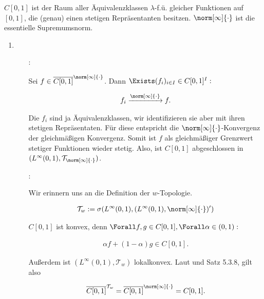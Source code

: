 \begin{solution}

$C[0, 1]$ ist der Raum aller Äquivalenzklassen $\lambda$-f.ü. gleicher Funktionen auf $[0, 1]$, die (genau) einen stetigen Repräsentanten besitzen.
$\norm[\infty]{\cdot}$ ist die essentielle Supremumsnorm.

\begin{enumerate}[label = \alph*)]

  \item
  \phantom{}

  \begin{itemize}

    \item
    [\Quote{$\norm[\infty]{\cdot}$}:]

    Sei $f \in \overline{C[0, 1]}^{\norm[\infty]{\cdot}}$.
    Dann $\Exists (f_i)_{i \in I} \in C[0, 1]^I:$

    \begin{align*}
      f_i \xrightarrow{\norm[\infty]{\cdot}} f.
    \end{align*}

    Die $f_i$ sind ja Äquivalenzklassen, wir identifizieren sie aber mit ihren stetigen Repräsentaten.
    Für diese entspricht die $\norm[\infty]{\cdot}$-Konvergenz der gleichmäßigen Konvergenz.
    Somit ist $f$ als gleichmäßiger Grenzwert stetiger Funktionen wieder stetig.
    Also, ist $C[0, 1]$ abgeschlossen in $(L^\infty(0, 1), \mathcal{T}_{\norm[\infty]{\cdot}})$.

    \item
    [\Quote{$w$}:]

    Wir erinnern uns an die Definition der $w$-Topologie.

    \begin{align*}
      \mathcal{T}_w
      :=
      \sigma
      (
        L^\infty(0,1),
        (L^\infty(0,1), \norm[\infty]{\cdot})^\prime
      )
    \end{align*}

    $C[0, 1]$ ist konvex, denn $\Forall f, g \in C[0, 1], \Forall \alpha \in (0, 1):$

    \begin{align*}
      \alpha f + (1 - \alpha) g \in C[0, 1].
    \end{align*}

    Außerdem ist $(L^\infty(0, 1), \mathcal{T}_w)$ lokalkonvex.
    Laut \Quote{$\norm[\infty]{\cdot}$} und Satz 5.3.8, gilt also

    \begin{align*}
      \overline{C[0,1]}^{\mathcal{T}_w}
      =
      \overline{C[0,1]}^{\norm[\infty]{\cdot}}
      =
      C[0, 1].
    \end{align*}


\end{itemize}
\end{enumerate}
\end{solution}
